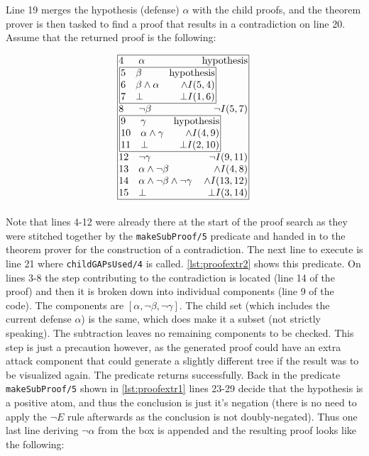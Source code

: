 \documentclass[11pt,twoside,a4paper]{report}
\begin{document}
Line 19 merges the hypothesis (defense) $\alpha$ with the child proofs, and the theorem prover is then tasked to find a proof that results in a contradiction on line 20. Assume that the returned proof is the following:

\[\vbox{\offinterlineskip\halign{
&\tabskip=1.5em#\strut&$#$\hfil\tabskip=1em&\hfil$#$\tabskip=0em\cr
%
\multispan3\vbox{\halign{
\vrule#&&\hskip.1em\tabskip=1em#\strut&$#$\hfil\tabskip=1em&\hfil$#$\hskip0.1em\tabskip=0em&\vrule#\cr
\noalign{\hrule}
%
&4&\alpha&\mbox{hypothesis}&\cr
%
&\multispan3\,\vbox{\halign{
\vrule#&&\hskip.1em\tabskip=1em#\strut&$#$\hfil\tabskip=1em&\hfil$#$\hskip0.1em\tabskip=0em&\vrule#\cr
\noalign{\hrule}
%
&5&\beta&\mbox{hypothesis}&\cr
&6&\beta\wedge\alpha&\wedge I(5,4)&\cr
&7&\bot&\bot I(1,6)&\cr
%
\noalign{\hrule}}}\,&\cr
%
&8&\neg\beta&\neg I(5,7)&\cr
%
&\multispan3\,\vbox{\halign{
\vrule#&&\hskip.1em\tabskip=1em#\strut&$#$\hfil\tabskip=1em&\hfil$#$\hskip0.1em\tabskip=0em&\vrule#\cr
\noalign{\hrule}
%
&9&\gamma&\mbox{hypothesis}&\cr
&10&\alpha\wedge\gamma&\wedge I(4,9)&\cr
&11&\bot&\bot I(2,10)&\cr
%
\noalign{\hrule}}}\,&\cr
%
&12&\neg\gamma&\neg I(9,11)&\cr
&13&\alpha\wedge\neg\beta&\wedge I(4,8)&\cr
&14&\alpha\wedge\neg\beta\wedge\neg\gamma&\wedge I(13,12)&\cr
&15&\bot&\bot I(3,14)&\cr
%
\noalign{\hrule}}}\,\cr
}}\]

Note that lines 4-12 were already there at the start of the proof search as they were stitched together by the \lstinline$makeSubProof/5$ predicate and handed in to the theorem prover for the construction of a contradiction. The next line to execute is line 21 where \lstinline$childGAPsUsed/4$ is called. \autoref{lst:proofextr2} shows this predicate. On lines 3-8 the step contributing to the contradiction is located (line 14 of the proof) and then it is broken down into individual components (line 9 of the code). The components are $[\alpha, \neg\beta, \neg\gamma]$. The child set (which includes the current defense $\alpha$) is the same, which does make it a subset (not strictly speaking). The subtraction leaves no remaining components to be checked. This step is just a precaution however, as the generated proof could have an extra attack component that could generate a slightly different tree if the result was to be visualized again. The predicate returns successfully. Back in the predicate \lstinline$makeSubProof/5$ shown in \autoref{lst:proofextr1} lines 23-29 decide that the hypothesis is a positive atom, and thus the conclusion is just it's negation (there is no need to apply the $\neg E$ rule afterwards as the conclusion is not doubly-negated). Thus one last line deriving $\neg\alpha$ from the box is appended and the resulting proof looks like the following:
\end{document}
